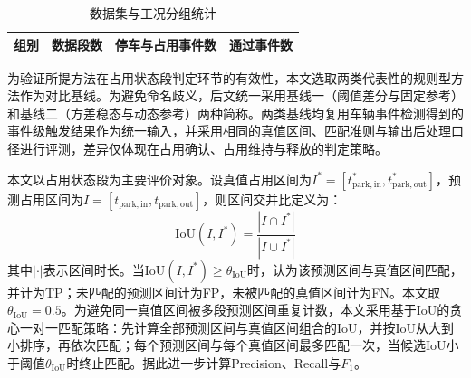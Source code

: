 \documentclass{xdupgthesis}
\begin{document}
{
    \setlength{\intextsep}{0.75\baselineskip}
\begin{table}[H]
    \centering
    \caption{数据集与工况分组统计}
    \label{tab:ch4_dataset}
    \setlength{\tabcolsep}{8pt}
    \begin{tabular}{c c c c}
        \toprule
        组别 & 数据段数 & 停车与占用事件数 & 通过事件数 \\
        \midrule
        
    \end{tabular}
\end{table}
\vspace{-0.5\baselineskip}
}

为验证所提方法在占用状态段判定环节的有效性，本文选取两类代表性的规则型方法作为对比基线。为避免命名歧义，后文统一采用基线一（阈值差分与固定参考）和基线二（方差稳态与动态参考）两种简称。两类基线均复用车辆事件检测得到的事件级触发结果作为统一输入，并采用相同的真值区间、匹配准则与输出后处理口径进行评测，差异仅体现在占用确认、占用维持与释放的判定策略。

本文以占用状态段为主要评价对象。设真值占用区间为$I^{*}=[t^{*}_{\mathrm{park,in}},t^{*}_{\mathrm{park,out}}]$，预测占用区间为$I=[t_{\mathrm{park,in}},t_{\mathrm{park,out}}]$，则区间交并比定义为：
\begin{equation}
    \mathrm{IoU}(I,I^{*})=\frac{|I\cap I^{*}|}{|I\cup I^{*}|}
\end{equation}
其中$|\cdot|$表示区间时长。当$\mathrm{IoU}(I,I^{*})\ge \theta_{\mathrm{IoU}}$时，认为该预测区间与真值区间匹配，并计为TP；未匹配的预测区间计为FP，未被匹配的真值区间计为FN。本文取$\theta_{\mathrm{IoU}}=0.5$。为避免同一真值区间被多段预测区间重复计数，本文采用基于IoU的贪心一对一匹配策略：先计算全部预测区间与真值区间组合的IoU，并按IoU从大到小排序，再依次匹配；每个预测区间与每个真值区间最多匹配一次，当候选IoU小于阈值$\theta_{\mathrm{IoU}}$时终止匹配。据此进一步计算Precision、Recall与$F_1$。
\end{document}
